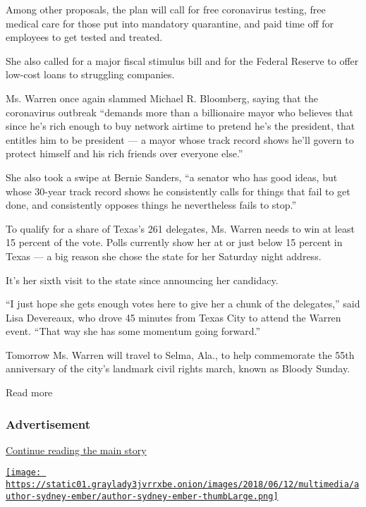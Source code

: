 Among other proposals, the plan will call for free coronavirus testing,
free medical care for those put into mandatory quarantine, and paid time
off for employees to get tested and treated.

She also called for a major fiscal stimulus bill and for the Federal
Reserve to offer low-cost loans to struggling companies.

Ms. Warren once again slammed Michael R. Bloomberg, saying that the
coronavirus outbreak ``demands more than a billionaire mayor who
believes that since he's rich enough to buy network airtime to pretend
he's the president, that entitles him to be president --- a mayor whose
track record shows he'll govern to protect himself and his rich friends
over everyone else.''

She also took a swipe at Bernie Sanders, ``a senator who has good ideas,
but whose 30-year track record shows he consistently calls for things
that fail to get done, and consistently opposes things he nevertheless
fails to stop.''

To qualify for a share of Texas's 261 delegates, Ms. Warren needs to win
at least 15 percent of the vote. Polls currently show her at or just
below 15 percent in Texas --- a big reason she chose the state for her
Saturday night address.

It's her sixth visit to the state since announcing her candidacy.

``I just hope she gets enough votes here to give her a chunk of the
delegates,'' said Lisa Devereaux, who drove 45 minutes from Texas City
to attend the Warren event. ``That way she has some momentum going
forward.''

Tomorrow Ms. Warren will travel to Selma, Ala., to help commemorate the
55th anniversary of the city's landmark civil rights march, known as
Bloody Sunday.

Read more

\hypertarget{advertisement-1}{%
\subsubsection{Advertisement}\label{advertisement-1}}

\protect\hyperlink{after-dfp-ad-mid2}{Continue reading the main story}

\href{https://www.nytimes3xbfgragh.onion/by/sydney-ember}{\texttt{[image: https://static01.graylady3jvrrxbe.onion/images/2018/06/12/multimedia/author-sydney-ember/author-sydney-ember-thumbLarge.png]}}

